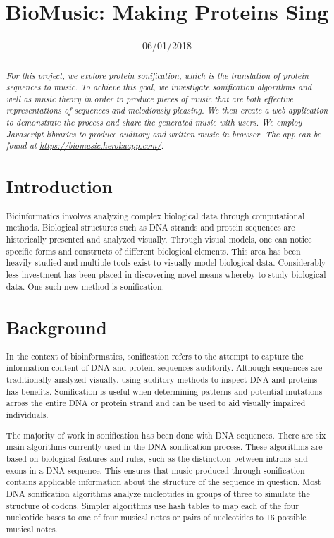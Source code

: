 \documentclass[11pt,a4paper]{article}
\title{BioMusic: Making Proteins Sing}
\date{06/01/2018}
\begin{document}
\maketitle
\begin{abstract}
  \textit{
  For this project, we explore protein sonification, which is the translation of protein sequences to music. To achieve this goal, we investigate sonification algorithms and well as music theory in order to produce pieces of music that are both effective representations of sequences and melodiously pleasing. We then create a web application to demonstrate the process and share the generated music with users. We employ Javascript libraries to produce auditory and written music in browser. The app can be found at \underline{https://biomusic.herokuapp.com/}.
  }

\section{Introduction}
Bioinformatics involves analyzing complex biological data through computational methods. Biological structures such as DNA strands and protein sequences are historically presented and analyzed visually. Through visual models, one can notice specific forms and constructs of different biological elements. This area has been heavily studied and multiple tools exist to visually model biological data. Considerably less investment has been placed in discovering novel means whereby to study biological data. One such new method is sonification. 


\section{Background}

In the context of bioinformatics, sonification refers to the attempt to capture the information content of DNA and protein sequences auditorily. Although sequences are traditionally analyzed visually, using auditory methods to inspect DNA and proteins has benefits. Sonification is useful when determining patterns and potential mutations across the entire DNA or protein strand and can be used to aid visually impaired individuals.

The majority of work in sonification has been done with DNA sequences. There are six main algorithms currently used in the DNA sonification process. These algorithms are based on biological features and rules, such as the distinction between introns and exons in a DNA sequence. This ensures that music produced through sonification contains applicable information about the structure of the sequence in question.  Most DNA sonification algorithms analyze nucleotides in groups of three to simulate the structure of codons. Simpler algorithms use hash tables to map each of the four nucleotide bases to one of four musical notes or pairs of nucleotides to 16 possible musical notes. 


\end{abstract}
\end{document}

